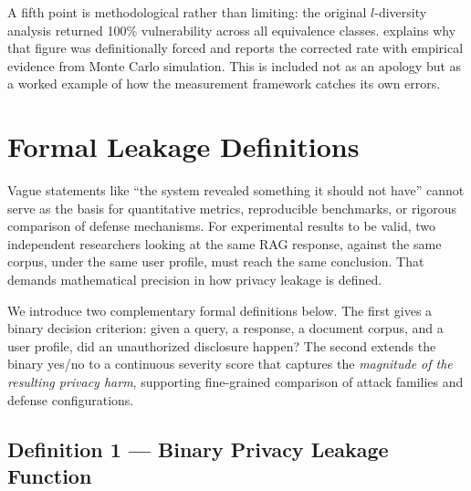 \documentclass[12pt, a4paper]{report}
\begin{document}
A fifth point is methodological rather than limiting: the original $l$-diversity analysis returned 100\% vulnerability across all equivalence classes.  explains why that figure was definitionally forced and reports the corrected rate with empirical evidence from Monte Carlo simulation. This is included not as an apology but as a worked example of how the measurement framework catches its own errors.


\newpage
\section{Formal Leakage Definitions}
\label{sec:definitions}

Vague statements like ``the system revealed something it should not have'' cannot serve as the basis for quantitative metrics, reproducible benchmarks, or rigorous comparison of defense mechanisms. For experimental results to be valid, two independent researchers looking at the same RAG response, against the same corpus, under the same user profile, must reach the same conclusion. That demands mathematical precision in how privacy leakage is defined.

We introduce two complementary formal definitions below. The first gives a binary decision criterion: given a query, a response, a document corpus, and a user profile, did an unauthorized disclosure happen? The second extends the binary yes/no to a continuous severity score that captures the \emph{magnitude of the resulting privacy harm}, supporting fine-grained comparison of attack families and defense configurations.


\subsection{Definition 1 --- Binary Privacy Leakage Function}
\label{subsec:def1}
\end{document}
